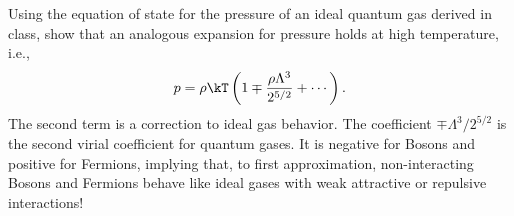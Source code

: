 \smallskip \subp
Using the equation of state for the pressure
of an ideal quantum gas derived in class,
show that an analogous expansion for pressure holds
at high temperature, i.e.,
$$
p = \rho \kT \left( 1 \mp \frac{\rho \Lambda^3}{2^{5/2}}
     + \cdots \right) .
$$
The second term is a correction to ideal gas behavior.
The coefficient $\mp \Lambda^3 / 2^{5/2}$
is the second virial coefficient for quantum gases.
It is negative for Bosons and positive for Fermions,
implying that, to first approximation,
non-interacting Bosons and Fermions behave like
ideal gases with weak attractive or repulsive interactions! 
